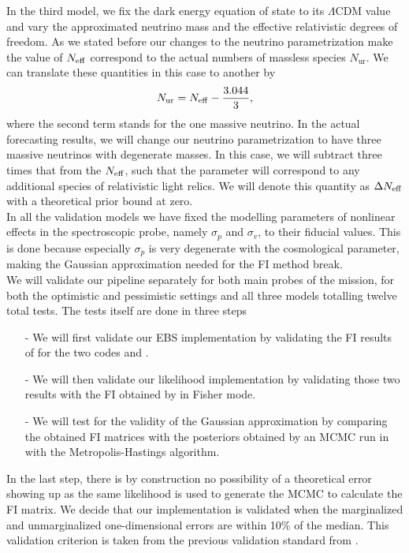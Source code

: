 \documentclass[../main.tex]{subfiles}
\begin{document}
In the third model, we fix the dark energy equation of state to its $\Lambda$CDM value and vary the approximated neutrino mass and the effective relativistic degrees of freedom. As we stated before our changes to the neutrino parametrization make the value of $N_\mathrm{eff}$ correspond to the actual numbers of massless species $N_\mathrm{ur}$. We can translate these quantities in this case to another by \begin{equation}
    N_\mathrm{ur} = N_\mathrm{eff} - \frac{3.044}{3},
\end{equation}
where the second term stands for the one massive neutrino. In the actual forecasting results, we will change our neutrino parametrization to have three massive neutrinos with degenerate masses. In this case, we will subtract three times that from the $N_\mathrm{eff}$, such that the parameter will correspond to any additional species of relativistic light relics. We will denote this quantity as $\Delta N_\mathrm{eff}$ with a theoretical prior bound at zero.\\
In all the validation models we have fixed the modelling parameters of nonlinear effects in the spectroscopic probe, namely $\sigma_p$ and $\sigma_v$, to their fiducial values. This is done because especially $\sigma_p$ is very degenerate with the cosmological parameter, making the Gaussian approximation needed for the FI method break.\\
We will validate our pipeline separately for both main probes of the \Euclid mission, for both the optimistic and pessimistic settings and all three models totalling twelve total tests. The tests itself are done in three steps \begin{itemize}
    \item[-] We will first validate our EBS implementation by validating the FI results of \cosmicfish for the two codes \camb and \class.
    \item[-] We will then validate our likelihood implementation by validating those two results with the FI obtained by \montepython in Fisher mode.
    \item[-] We will test for the validity of the Gaussian approximation by comparing the obtained FI matrices with the posteriors obtained by an MCMC run in \montepython with the Metropolis-Hastings algorithm.    
\end{itemize}
In the last step, there is by construction no possibility of a theoretical error showing up as the same likelihood is used to generate the MCMC to calculate the FI matrix. We decide that our implementation is validated when the marginalized and unmarginalized one-dimensional errors are within 10\% of the median. This validation criterion is taken from the previous \Euclid validation standard from \cite{casas2023euclid}.\\
\end{document}
